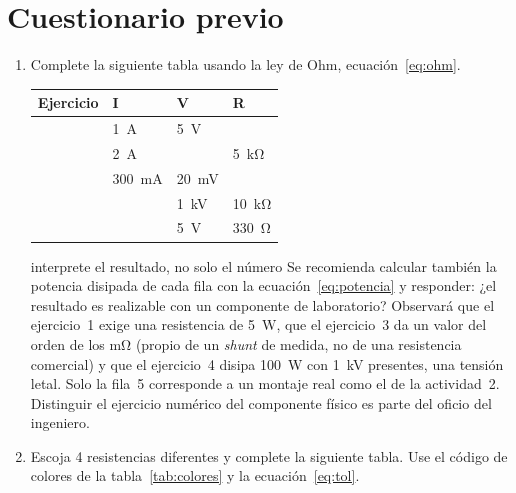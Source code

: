 \documentclass[11pt,a4paper]{article}
\begin{document}
\section{Cuestionario previo}
\begin{enumerate}
\item Complete la siguiente tabla usando la ley de Ohm, ecuación~\eqref{eq:ohm}.

\begin{table}[H]
    \centering
    \renewcommand{\arraystretch}{1.45}
    \begin{tabular}{|>{\centering\arraybackslash}m{2cm}|>{\centering\arraybackslash}m{2.6cm}
                    |>{\centering\arraybackslash}m{2.6cm}|>{\centering\arraybackslash}m{2.6cm}|}
    \hline
    \textbf{Ejercicio} & \textbf{I} & \textbf{V} & \textbf{R}\\
    \hline
    1 & \qty{1}{\ampere}        & \qty{5}{\volt}         & \\
    \hline
    2 & \qty{2}{\ampere}        &                        & \qty{5}{\kilo\ohm}\\
    \hline
    3 & \qty{300}{\milli\ampere}& \qty{20}{\milli\volt}  & \\
    \hline
    4 &                         & \qty{1}{\kilo\volt}    & \qty{10}{\kilo\ohm}\\
    \hline
    5 &                         & \qty{5}{\volt}         & \qty{330}{\ohm}\\
    \hline
    \end{tabular}
\end{table}

\begin{notatec}{interprete el resultado, no solo el número}
Se recomienda calcular también la potencia disipada de cada fila con la
ecuación~\eqref{eq:potencia} y responder: ¿el resultado es realizable con un componente de
laboratorio? Observará que el ejercicio~1 exige una resistencia de \qty{5}{\watt}, que el
ejercicio~3 da un valor del orden de los \unit{\milli\ohm} (propio de un \emph{shunt} de medida,
no de una resistencia comercial) y que el ejercicio~4 disipa \qty{100}{\watt} con
\qty{1}{\kilo\volt} presentes, una tensión letal. Solo la fila~5 corresponde a un montaje real
como el de la actividad~2. Distinguir el ejercicio numérico del componente físico es parte del
oficio del ingeniero.
\end{notatec}

\item Escoja 4 resistencias diferentes y complete la siguiente tabla. Use el código de colores de
la tabla~\ref{tab:colores} y la ecuación~\eqref{eq:tol}.


\end{enumerate}
\end{document}
